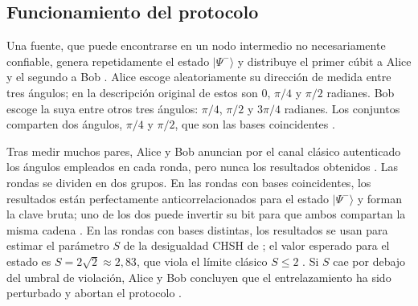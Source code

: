 \subsection{Funcionamiento del protocolo}

Una fuente, que puede encontrarse en un nodo intermedio no necesariamente confiable, genera repetidamente el estado $|\Psi^-\rangle$ y distribuye el primer cúbit a Alice y el segundo a Bob \citep{ekert1991}. Alice escoge aleatoriamente su dirección de medida entre tres ángulos; en la descripción original de \cite{ekert1991} estos son $0$, $\pi/4$ y $\pi/2$ radianes. Bob escoge la suya entre otros tres ángulos: $\pi/4$, $\pi/2$ y $3\pi/4$ radianes. Los conjuntos comparten dos ángulos, $\pi/4$ y $\pi/2$, que son las bases coincidentes \citep{ekert1991,gisin2002}.

Tras medir muchos pares, Alice y Bob anuncian por el canal clásico autenticado los ángulos empleados en cada ronda, pero nunca los resultados obtenidos \citep{bennett1984,ekert1991}. Las rondas se dividen en dos grupos. En las rondas con bases coincidentes, los resultados están perfectamente anticorrelacionados para el estado $|\Psi^-\rangle$ y forman la clave bruta; uno de los dos puede invertir su bit para que ambos compartan la misma cadena \citep{ekert1991}. En las rondas con bases distintas, los resultados se usan para estimar el parámetro $S$ de la desigualdad CHSH de \cite{clauser1969}; el valor esperado para el estado es $S = 2\sqrt{2} \approx 2{,}83$, que viola el límite clásico $S \leq 2$ \citep{clauser1969,ekert1991}. Si $S$ cae por debajo del umbral de violación, Alice y Bob concluyen que el entrelazamiento ha sido perturbado y abortan el protocolo \citep{ekert1991,scarani2009}.

